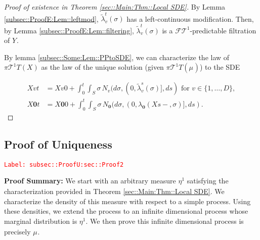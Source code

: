 \documentclass[12pt]{article}
\newcommand{\mc}{\mathcal}
\newcommand{\te}{\text}
\newcommand{\tr}{\textcolor{red}}
\newcommand{\labe}[1]{\tr{\texttt{Label: #1}}}
\newcommand{\pfsum}{\textbf{Proof Summary: }}
\newcommand{\ind}{\hspace{24pt}}
\renewcommand{\root}{\mathbf{0}}				%
\renewcommand{\v}{v}							%
\renewcommand{\S}{S}							%
\newcommand{\s}{\sigma}							%
\newcommand{\T}{T}								%
\renewcommand{\t}{t}							%
\newcommand{\proj}{\pi}							%
\renewcommand{\tt}{s}							%
\newcommand{\F}{\mc{F}}							%
\newcommand{\X}{X}								%
\newcommand{\degr}{D}							%
\newcommand{\tree}{\mc{T}}						%
\newcommand{\sln}[1]{^{#1}}						%
\newcommand{\poiss}[1]{N_{#1}}						%
\newcommand{\rxvtts}[2]{Y_{#1}{#2}}					%
\newcommand{\m}[3]{\mu_{#2#1}^{#3}}						%
\newcommand{\mmm}[3]{\eta_{#2#1}^{#3}}						%
\newcommand{\rate}[1]{\lambda_{#1}}					%
\newcommand{\crate}[2]{\alt{\lambda}_{#1}^{#2}}		%
\newcommand{\alt}{\widetilde}						%
\begin{document}
\begin{proof}[Proof of existence in Theorem \ref{sec::Main:Thm::Local SDE}]
By Lemma \ref{subsec::ProofE:Lem::leftmod}, \(\crate{\v}{\t}(\s)\) has a left-continuous modification. Then, by Lemma \ref{subsec::ProofE:Lem::filtering}, \(\crate{\v}{\t}(\s)\) is a \(\F{\tree\sln{1}}{}\)-predictable filtration of \(\rxvtts{}{}\).

\ind By lemma \ref{subsec::Some:Lem::PPtoSDE}, we can characterize the law of \(\proj{\tree\sln{1}}{\T}(\X{}{})\) as the law of the unique solution (given \(\proj{\tree\sln{1}}{\T}(\m{}{}{})\)) to the SDE

\begin{align*}
\X{\v}{\t} &= \X{\v}{0} + \int_0^\t\int_\S \s\,\poiss{\v}(d\s,(0,\crate{\v}{\tt}(\s)],d\tt) \te{ for } \v \in \{1,\dots,\degr\},\\
\X{\root}{\t} &= \X{\root}{0} + \int_0^\t\int_\S \s\,\poiss{\root}(d\s,(0,\rate{\root}(\X{}{\tt-},\s)],d\tt).
\end{align*}
\end{proof}

\subsection{Proof of Uniqueness}
\label{subsec::ProofU:sec::Proof2}\labe{subsec::ProofU:sec::Proof2}

\pfsum We start with an arbitrary measure \(\mmm{}{}{1}\) satisfying the characterization provided in Theorem \ref{sec::Main:Thm::Local SDE}. We characterize the density of this measure with respect to a simple process. Using these densities, we extend the process to an infinite dimensional process whose marginal distribution is \(\mmm{}{}{1}\). We then prove this infinite dimensional process is precisely \(\m{}{}{}\).
\end{document}
